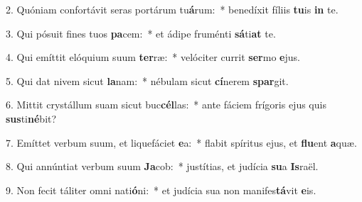 2. Quóniam confortávit seras portárum tu\textbf{á}rum:~*  benedíxit fíliis \textbf{tu}is \textbf{in} te.\

3. Qui pósuit fines tuos \textbf{pa}cem:~*  et ádipe fruménti \textbf{sá}ti\textbf{at} te.\

4. Qui emíttit elóquium suum \textbf{ter}ræ:~*  velóciter currit \textbf{ser}mo \textbf{e}jus.\

5. Qui dat nivem sicut \textbf{la}nam:~*  nébulam sicut \textbf{cí}nerem \textbf{spar}git.\

6. Mittit crystállum suam sicut buc\textbf{cél}las:~*  ante fáciem frígoris ejus quis \textbf{sus}ti\textbf{né}bit?\

7. Emíttet verbum suum, et liquefáciet \textbf{e}a:~*  flabit spíritus ejus, et \textbf{flu}ent \textbf{a}quæ.\

8. Qui annúntiat verbum suum \textbf{Ja}cob:~*  justítias, et judícia \textbf{su}a \textbf{Is}raël.\

9. Non fecit táliter omni nati\textbf{ó}ni:~*  et judícia sua non manifes\textbf{tá}vit \textbf{e}is.\

